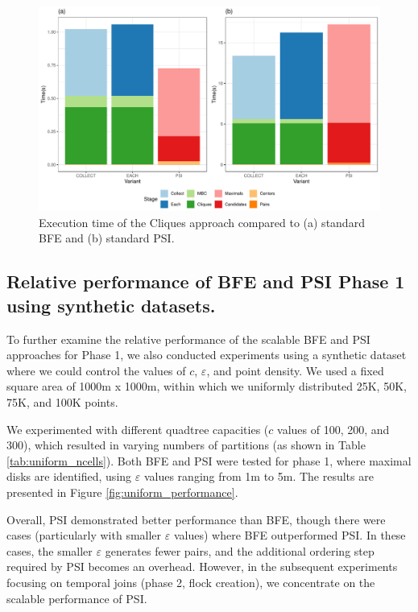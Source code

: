 \begin{figure}
    \centering
    \includegraphics[width=\linewidth] {chapterPFlocks/figures/plots/10_cmbc/cmbc2.pdf}
    \caption{Execution time of the Cliques approach compared to (a) standard BFE and (b) standard PSI.}\label{fig:cmbc_variants}
\end{figure}

\subsection{Relative performance of BFE and PSI Phase 1 using synthetic datasets.}
To further examine the relative performance of the scalable BFE and PSI approaches for Phase 1, we also conducted experiments using a synthetic dataset where we 
could control the values of $c$, $\varepsilon$, and point density. We used a fixed square area of 1000m x 1000m, within which we uniformly distributed 25K, 50K, 
75K, and 100K points.

We experimented with different quadtree capacities ($c$ values of 100, 200, and 300), which resulted in varying numbers of partitions (as shown in Table 
\ref{tab:uniform_ncells}). Both BFE and PSI were tested for phase 1, where maximal disks are identified, using $\varepsilon$ values ranging from 1m to 5m. The 
results are presented in Figure \ref{fig:uniform_performance}.

Overall, PSI demonstrated better performance than BFE, though there were cases (particularly with smaller $\varepsilon$ values) where BFE outperformed PSI. In 
these cases, the smaller $\varepsilon$ generates fewer pairs, and the additional ordering step required by PSI becomes an overhead. However, in the subsequent 
experiments focusing on temporal joins (phase 2, flock creation), we concentrate on the scalable performance of PSI.

